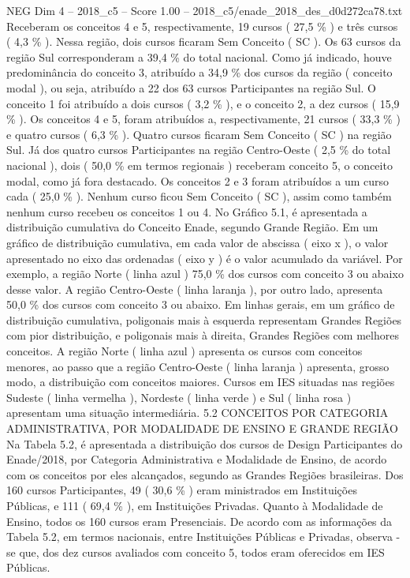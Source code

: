 \begin{textsample}{NEG Dim 4 – 2018\_c5 – Score 1.00 – 2018\_c5/enade\_2018\_des\_d0d272ca78.txt}
Receberam os conceitos 4 e 5, respectivamente, 19 cursos ( 27,5 \% ) e três cursos ( 4,3 \% ).
Nessa região, dois cursos ficaram Sem Conceito ( SC ).
Os 63 cursos da região Sul corresponderam a 39,4 \% do total nacional.
Como já indicado, houve predominância do conceito 3, atribuído a 34,9 \% dos cursos da região ( conceito modal ), ou seja, atribuído a 22 dos 63 cursos Participantes na região Sul.
O conceito 1 foi atribuído a dois cursos ( 3,2 \% ), e o conceito 2, a dez cursos ( 15,9 \% ).
Os conceitos 4 e 5, foram atribuídos a, respectivamente, 21 cursos ( 33,3 \% ) e quatro cursos ( 6,3 \% ).
Quatro cursos ficaram Sem Conceito ( SC ) na região Sul.
Já dos quatro cursos Participantes na região Centro-Oeste ( 2,5 \% do total nacional ), dois ( 50,0 \% em termos regionais ) receberam conceito 5, o conceito modal, como já fora destacado.
Os conceitos 2 e 3 foram atribuídos a um curso cada ( 25,0 \% ).
Nenhum curso ficou Sem Conceito ( SC ), assim como também nenhum curso recebeu os conceitos 1 ou 4.
No Gráfico 5.1, é apresentada a distribuição cumulativa do Conceito Enade, segundo Grande Região.
Em um gráfico de distribuição cumulativa, em cada valor de abscissa ( eixo x ), o valor apresentado no eixo das ordenadas ( eixo y ) é o valor acumulado da variável.
Por exemplo, a região Norte ( linha azul ) 75,0 \% dos cursos com conceito 3 ou abaixo desse valor.
A região Centro-Oeste ( linha laranja ), por outro lado, apresenta 50,0 \% dos cursos com conceito 3 ou abaixo.
Em linhas gerais, em um gráfico de distribuição cumulativa, poligonais mais à esquerda representam Grandes Regiões com pior distribuição, e poligonais mais à direita, Grandes Regiões com melhores conceitos.
A região Norte ( linha azul ) apresenta os cursos com conceitos menores, ao passo que a região Centro-Oeste ( linha laranja ) apresenta, grosso modo, a distribuição com conceitos maiores.
Cursos em IES situadas nas regiões Sudeste ( linha vermelha ), Nordeste ( linha verde ) e Sul ( linha rosa ) apresentam uma situação intermediária. 5.2 CONCEITOS POR CATEGORIA ADMINISTRATIVA, POR MODALIDADE DE ENSINO E GRANDE REGIÃO Na Tabela 5.2, é apresentada a distribuição dos cursos de Design Participantes do Enade/2018, por Categoria Administrativa e Modalidade de Ensino, de acordo com os conceitos por eles alcançados, segundo as Grandes Regiões brasileiras.
Dos 160 cursos Participantes, 49 ( 30,6 \% ) eram ministrados em Instituições Públicas, e 111 ( 69,4 \% ), em Instituições Privadas.
Quanto à Modalidade de Ensino, todos os 160 cursos eram Presenciais.
De acordo com as informações da Tabela 5.2, em termos nacionais, entre Instituições Públicas e Privadas, observa -se que, dos dez cursos avaliados com conceito 5, todos eram oferecidos em IES Públicas.

\end{textsample}
